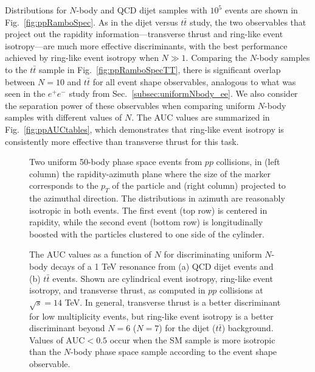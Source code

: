 \documentclass[letterpaper,11pt]{article}
\DeclareRobustCommand{\Sec}[1]{Sec.~\ref{#1}}
\DeclareRobustCommand{\Fig}[1]{Fig.~\ref{#1}}
\begin{document}
Distributions for $N$-body and QCD dijet samples with $10^5$ events are shown in \Fig{fig:ppRamboSpec}.
%
As in the dijet versus $t \bar{t}$ study, the two observables that project out the rapidity information---transverse thrust and ring-like event isotropy---are much more effective discriminants, with the best performance achieved by ring-like event isotropy when $N\gg1$.
%
Comparing the $N$-body samples to the $t\bar{t}$ sample in \Fig{fig:ppRamboSpecTT}, there is significant overlap between $N=10$ and $t\bar{t}$ for all event shape observables, analogous to what was seen in the $e^+e^-$ study from \Sec{subsec:uniformNbody_ee}. 
%
We also consider the separation power of these observables when comparing uniform $N$-body samples with different values of $N$.
%
The AUC values are summarized in \Fig{fig:ppAUCtables}, which demonstrates that ring-like event isotropy is consistently more effective than transverse thrust for this task.


\begin{figure}[p]
%
\centering
  \hfill
{}
 \hfill
  \hfill
{}
   
\caption{Two uniform 50-body phase space events from $pp$ collisions, in (left column) the rapidity-azimuth plane where the size of the marker corresponds to the $p_T$ of the particle and (right column) projected to the azimuthal direction.
%
The distributions in azimuth are reasonably isotropic in both events.
%
The first event (top row) is centered in rapidity, while the second event (bottom row) is longitudinally boosted with the particles clustered to one side of the cylinder.}
%
\label{fig:projVis}
\end{figure}


\begin{figure}[p]
\centering
\hfill
\caption{The AUC values as a function of $N$ for discriminating uniform $N$-body decays of a 1 TeV resonance from (a) QCD dijet events and (b) $t\bar{t}$ events.
%
Shown are cylindrical event isotropy, ring-like event isotropy, and transverse thrust, as computed in $pp$ collisions at $\sqrt{s} = 14$ TeV.
%
In general, transverse thrust is a better discriminant for low multiplicity events, but ring-like event isotropy is a better discriminant beyond $N = 6$ ($N = 7$) for the dijet ($t\bar{t}$) background. 
%
Values of $\text{AUC} <0.5$ occur when the SM sample is more isotropic than the $N$-body phase space sample according to the event shape observable.
}
\label{fig:AUCofRamboPP}
\end{figure}
\end{document}
